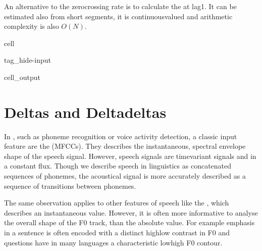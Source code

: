 \documentclass[letterpaper,10pt,english]{jupyterBook}
\begin{document}
\sphinxAtStartPar
An alternative to the zero\sphinxhyphen{}crossing rate is to calculate the
{\hyperref[\detokenize{Representations/Autocorrelation_and_autocovariance::doc}]{}} at lag\sphinxhyphen{}1. It can
be estimated also from short segments, it is continuous\sphinxhyphen{}valued and
arithmetic complexity is also \(O(N)\).

\begin{sphinxuseclass}{cell}
\begin{sphinxuseclass}{tag_hide-input}\begin{sphinxVerbatimOutput}

\begin{sphinxuseclass}{cell_output}
\noindent{}

\end{sphinxuseclass}\end{sphinxVerbatimOutput}

\end{sphinxuseclass}
\end{sphinxuseclass}
\sphinxstepscope


\section{Deltas and Delta\sphinxhyphen{}deltas}
\label{\detokenize{Representations/Deltas_and_Delta-deltas:deltas-and-delta-deltas}}\label{\detokenize{Representations/Deltas_and_Delta-deltas::doc}}
\sphinxAtStartPar
In , such as
phoneme recognition or voice activity detection, a classic input feature
are the 
(MFCCs). They describes the instantaneous, spectral envelope shape of
the speech signal. However, speech signals are time\sphinxhyphen{}variant signals and
in a constant flux. Though we describe speech in linguistics as
concatenated sequences of phonemes, the acoustical signal is more
accurately described as a sequence of transitions between phonemes.

\sphinxAtStartPar
The same observation applies to other features of speech like the
, which describes
an instantaneous value. However, it is often more informative to analyse
the overall shape of the F0 track, than the absolute value. For example
emphasis in a sentence is often encoded with a distinct high\sphinxhyphen{}low
contrast in F0 and questions have in many languages a characteristic
low\sphinxhyphen{}high F0 contour.
\end{document}
